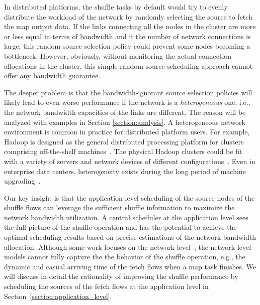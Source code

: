 \documentclass[10pt,journal,compsoc]{IEEEtran}
\begin{document}
In distributed platforms, the shuffle tasks by default
would try to evenly distribute the workload of the network
by randomly selecting the source to fetch the map output data. 
If the links connecting all the nodes in the cluster
are more or less equal in terms of bandwidth
and if the number of network connections is
large, this random source selection policy could prevent some nodes becoming a bottleneck.
However, obviously, without monitoring the actual connection
allocations %
in the cluster, this simple random source scheduling approach cannot offer
any bandwidth guarantee. 

The deeper problem is that the bandwidth-ignorant source selection policies will likely lead to even worse performance
if the network is a \emph{heterogeneous} one,
i.e., the network bandwidth capacities of the links are different.
The reason will be analyzed with examples in Section \ref{section:analysis}.
A heterogeneous network environment is common in practice
for distributed platform users.
For example, Hadoop is designed as the general distributed processing platform for 
clusters comprising off-the-shelf machines~\cite{dean2008mapreduce}. 
The physical Hadoop clusters could be fit with a variety of servers and network devices of different configurations~\cite{zaharia2008improving}. 
Even in enterprise data centers, heterogeneity exists during the long period of machine upgrading~\cite{kant2009data}.

Our key insight is that the application-level scheduling of the source nodes of the shuffle flows can leverage the sufficient shuffle information to maximize the network bandwidth utilization. 
A central scheduler at the application level sees the full picture of the shuffle operation and has the potential to achieve the optimal scheduling results based on precise estimations of the network bandwidth allocation.
Although some work focuses on the network level~\cite{shieh2011sharing,chowdhury2011managing,chowdhury2014efficient,chowdhury2015efficient}, 
the network level models cannot fully capture the the behavior of the shuffle operation, e.g., the dynamic and casual arriving time of the fetch flows
when a map task finishes. 
We will discuss in detail the rationality of improving the shuffle performance by scheduling the sources of the fetch flows at the application level in Section~\ref{section:application_level}.
\end{document}
